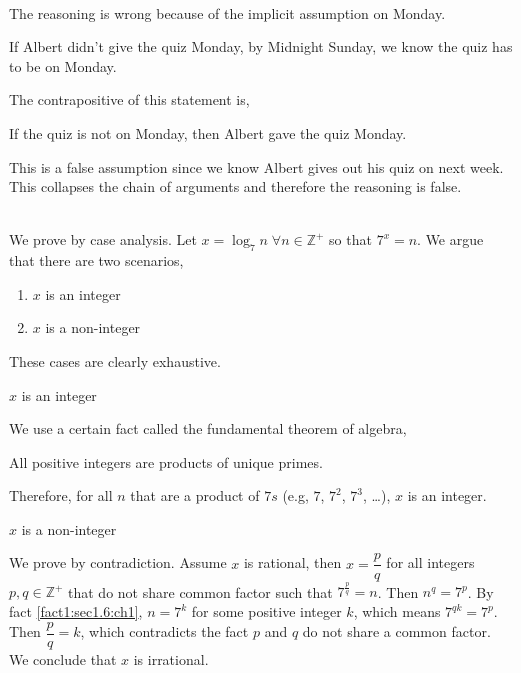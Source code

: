 \begin{pr}\leavevmode
    \\
    The reasoning is wrong because of the implicit assumption
    on Monday.

    \begin{assPr} \label{assPr:1.5:sec1}
        If Albert didn't give the quiz  Monday,
        by Midnight Sunday, we know the quiz has to be on Monday.
    \end{assPr}

    The contrapositive of this statement is,

    \begin{assPr}
        If the quiz is not on Monday, then Albert gave the quiz
         Monday.
    \end{assPr}

    This is a false assumption since we know Albert gives out
    his quiz on next week. This collapses the chain of arguments
    and therefore the reasoning is false.
\end{pr}

\begin{pr}\leavevmode
    \\
    We prove by case analysis. Let $x = \log_{7} n \;\forall n \in \mathbb{Z}^{+}$
    so that $7^x = n$.
    We argue that there are two scenarios,
    \begin{enumerate}
        \item $x$ is an integer
        \item $x$ is a non-integer
    \end{enumerate}
    These cases are clearly exhaustive.
    \begin{casesp}
        \item $x$ is an integer
        
        We use a certain fact called the fundamental theorem of algebra,

        \begin{factPr} \label{fact1:sec1.6:ch1}
            All positive integers are products of unique primes.
        \end{factPr}

        Therefore, for all $n$ that are a product of $7s$ (e.g, $7$, $7^2$, $7^3$, \ldots),
        $x$ is an integer.
        
        \item $x$ is a non-integer
        
        We prove by contradiction. Assume $x$ is rational, then $x = \dfrac{p}{q}$
        for all integers $p,q \in \mathbb{Z}^{+}$ that do not share common factor such that $7^{\frac{p}{q}} = n$.
        Then $n^q = 7^p$. By fact \ref{fact1:sec1.6:ch1}, $n = 7^k$ for some positive integer $k$,
        which means $7^{qk} = 7^p$. Then $\dfrac{p}{q} = k$, which contradicts the fact $p$
        and $q$ do not share a common factor. We conclude that $x$ is irrational.
    \end{casesp}
\end{pr}

